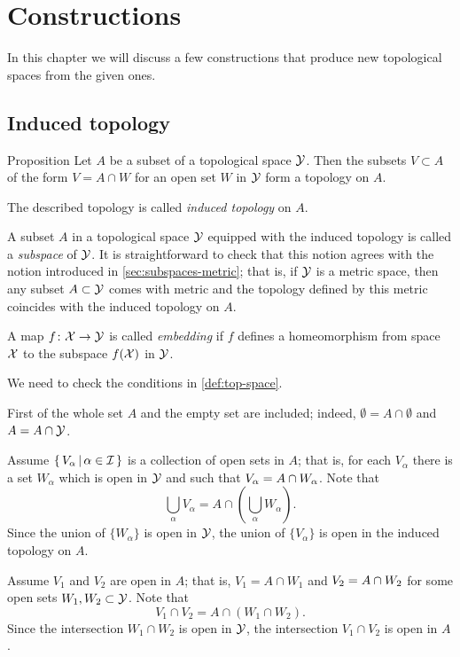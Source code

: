 \chapter{Constructions}

In this chapter we will discuss a few constructions that produce new topological spaces from the given ones.

\section{Induced topology}\label{sec:induced-topology}


\begin{thm}{Proposition}
Let $A$ be a subset of a topological space $\mathcal{Y}$.
Then the subsets $V\subset A$ of the form $V=A\cap W$ for an open set $W$ in $\mathcal{Y}$ form a topology on $A$.
\end{thm}

The described topology is called \emph{induced topology} on $A$.

A subset $A$ in a topological space $\mathcal{Y}$ equipped with the induced topology is called a \emph{subspace} of $\mathcal{Y}$.
It is straightforward to check that this notion agrees with the notion introduced in \ref{sec:subspaces-metric};
that is, if $\mathcal{Y}$ is a metric space, then any subset $A\subset\mathcal{Y}$ comes with metric
and the topology defined by this metric coincides with the induced topology on $A$.

A map $f\colon\mathcal{X}\to \mathcal{Y}$ is called \emph{embedding} if $f$ defines a homeomorphism from space $\mathcal{X}$ to the subspace $f(\mathcal{X})$ in $\mathcal{Y}$.

We need to check the conditions in \ref{def:top-space}.

First of the whole set $A$ and the empty set are included;
indeed, $\emptyset=A\cap \emptyset$ and $A=A\cap \mathcal{Y}$.

Assume $\left\{\,{V_\alpha}\,\middle|\,{\alpha\in\mathcal{I}}\,\right\}$ is a collection of open sets in $A$;
that is, for each $V_\alpha$ there is a set $W_\alpha$ which is open in $\mathcal{Y}$ and such that $V_\alpha\z=A\cap W_\alpha$.
Note that
\[\bigcup_\alpha V_\alpha=A\cap\left(\bigcup_\alpha W_\alpha\right).\]
Since the union of $\{W_\alpha\}$ is open in $\mathcal{Y}$, the union of $\{V_\alpha\}$ is open in the induced topology on $A$.

Assume $V_1$ and $V_2$ are open in $A$; 
that is, $V_1=A\cap W_1$ and  $V_2\z=A\cap W_2$ for some open sets $W_1,W_2\subset\mathcal{Y}$.
Note that
\[V_1\cap V_2=A\cap(W_1\cap W_2).\]
Since the intersection $W_1\cap W_2$ is open in $\mathcal{Y}$,
the intersection $V_1\cap V_2$ is open in $A$.
\qeds

